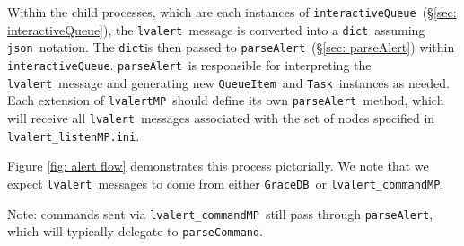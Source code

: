 \documentclass{article}
\newcommand{\GraceDB}{\texttt{GraceDB}}
\newcommand{\alert}{\texttt{lvalert}}
\newcommand{\lvalertMP}{\texttt{lvalertMP}}
\newcommand{\lvalertCommandMP}{\texttt{lvalert\_commandMP}}
\newcommand{\interactiveQueue}{\texttt{interactiveQueue}}
\newcommand{\parseAlert}{\texttt{parseAlert}}
\newcommand{\parseCommand}{\texttt{parseCommand}}
\newcommand{\QueueItem}{\texttt{QueueItem}}
\newcommand{\Task}{\texttt{Task}}
\newcommand{\lvalertMPini}{\texttt{lvalert\_listenMP.ini}}
\newcommand{\pythondict}{\texttt{dict}}
\newcommand{\json}{\texttt{json}}
\begin{document}
Within the child processes, which are each instances of \interactiveQueue~(\S\ref{sec: interactiveQueue}), the \alert~message is converted into a \pythondict~assuming \json~notation.
The \pythondict is then passed to \parseAlert~(\S\ref{sec: parseAlert}) within \interactiveQueue.
\parseAlert~is responsible for interpreting the \alert~message and generating new \QueueItem~and \Task~instances as needed.
Each extension of \lvalertMP~should define its own \parseAlert~method, which will receive all \alert~messages associated with the set of nodes specified in \lvalertMPini. 

Figure \ref{fig: alert flow} demonstrates this process pictorially.
We note that we expect \alert~messages to come from either \GraceDB~or \lvalertCommandMP.

Note: commands sent via \lvalertCommandMP~still pass through \parseAlert, which will typically delegate to \parseCommand.
\end{document}
